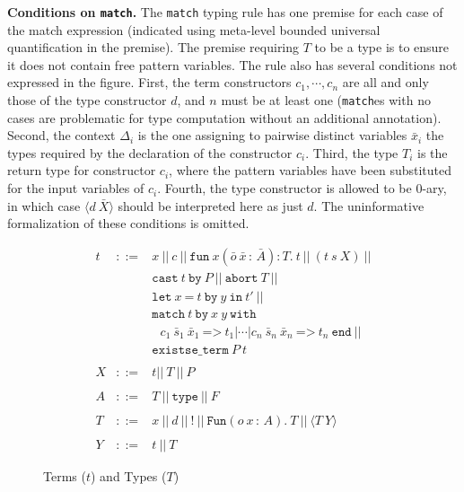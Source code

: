 \documentclass[preprint,natbib]{sigplanconf}
\newcommand{\Eq}[0]{\texttt{=}}
\newcommand{\bang}[0]{\texttt{!}}
\begin{document}
\textbf{Conditions on \texttt{match}.} The \texttt{match} typing rule
has one premise for each case of the match expression (indicated using
meta-level bounded universal quantification in the premise).  The
premise requiring $T$ to be a type is to ensure it does not contain
free pattern variables.  The rule also has several conditions not
expressed in the figure.  First, the term constructors $c_1, \cdots,
c_n$ are all and only those of the type constructor $d$, and $n$ must
be at least one (\texttt{match}es with no cases are problematic for
type computation without an additional annotation).  Second, the
context $\Delta_i$ is the one assigning to pairwise distinct variables
$\bar{x}_i$ the types required by the declaration of the constructor
$c_i$.  Third, the type $T_i$ is the return type for constructor
$c_i$, where the pattern variables have been substituted for the input
variables of $c_i$.  Fourth, the type constructor is allowed to be
$0$-ary, in which case $\langle d\ \bar{X}\rangle$ should be
interpreted here as just $d$.  The uninformative formalization of
these conditions is omitted.

\begin{figure}
\begin{eqnarray*}
t & ::= & x\ ||\ c\ ||\ 
       \texttt{fun}\ x(\bar{o}\ \bar{x}\,:\,\bar{A}) : T .\ t\ ||\ (t\ s\ X)\ ||
\\ 
\ &\ &        \texttt{cast}\ t\ \texttt{by}\ P  \ ||\ \texttt{abort}\ T\ ||\\ 
\ & \ & \texttt{let}\ x\ \Eq\ t\ \texttt{by}\ y\ \texttt{in}\ t' \ ||\ 
\\ 
\ & \ & \texttt{match}\ t\ \texttt{by}\ x\ y \ \texttt{with}\\
\ & \ & \ \ \ c_1\ \bar{s}_1\ \bar{x}_1\ \texttt{=>}\ t_1 |
 \cdots | c_n\ \bar{s}_n\ \bar{x}_n\ \texttt{=>}\ t_n\ \texttt{end}\ ||\\
\ & \ & \texttt{existse\_term}\ P\ t
\\
\\
X & ::= & t ||\ T\ ||\ P
\\
\\
A & ::= & T\ ||\ \texttt{type}\ ||\ F 
\\
\\
T & ::= & x\ ||\ d\ ||\ \bang\ ||\ 
     \texttt{Fun}(o\ x\,:\,A) . \ T\ ||\ \langle T\ Y\rangle 
\\
\\
Y & ::= & t\ ||\ T
\end{eqnarray*}
\caption{\label{fig:terms} Terms ($t$) and Types ($T$)}
\end{figure}
\end{document}

